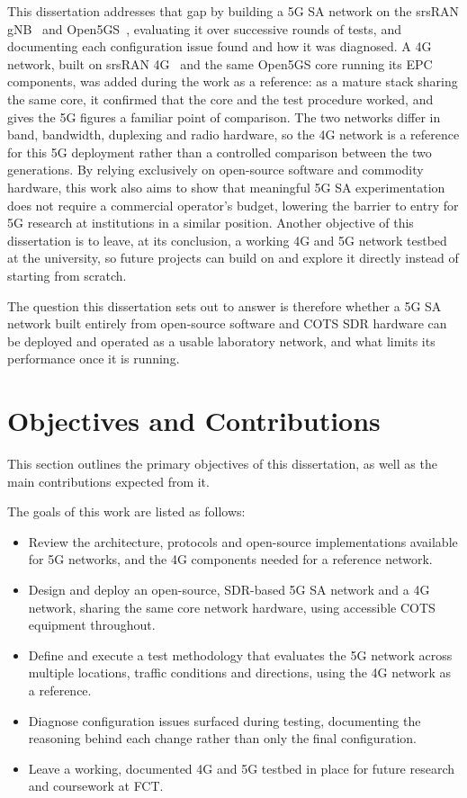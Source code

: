 This dissertation addresses that gap by building a 5G \gls{SA} network on the srsRAN \gls{gNB}~\cite{ocudu_project} and Open5GS~\cite{open5gs_repo}, evaluating it over successive rounds of tests, and documenting each configuration issue found and how it was diagnosed. A 4G network, built on srsRAN 4G~\cite{srsran_4g_repo} and the same Open5GS core running its \gls{EPC} components, was added during the work as a reference: as a mature stack sharing the same core, it confirmed that the core and the test procedure worked, and gives the 5G figures a familiar point of comparison. The two networks differ in band, bandwidth, duplexing and radio hardware, so the 4G network is a reference for this 5G deployment rather than a controlled comparison between the two generations. By relying exclusively on open-source software and commodity hardware, this work also aims to show that meaningful 5G \gls{SA} experimentation does not require a commercial operator's budget, lowering the barrier to entry for 5G research at institutions in a similar position. Another objective of this dissertation is to leave, at its conclusion, a working 4G and 5G network testbed at the university, so future projects can build on and explore it directly instead of starting from scratch. 

The question this dissertation sets out to answer is therefore whether a 5G \gls{SA} network built entirely from open-source software and \gls{COTS} \gls{SDR} hardware can be deployed and operated as a usable laboratory network, and what limits its performance once it is running.

\section{Objectives and Contributions}
\label{sec:objectives-contributions}

This section outlines the primary objectives of this dissertation, as well as the main contributions expected from it.

The goals of this work are listed as follows:
\begin{itemize}
    \item Review the architecture, protocols and open-source implementations available for 5G networks, and the 4G components needed for a reference network.
    \item Design and deploy an open-source, \gls{SDR}-based 5G \gls{SA} network and a 4G network, sharing the same core network hardware, using accessible \gls{COTS} equipment throughout.
    \item Define and execute a test methodology that evaluates the 5G network across multiple locations, traffic conditions and directions, using the 4G network as a reference.
    \item Diagnose configuration issues surfaced during testing, documenting the reasoning behind each change rather than only the final configuration.
    \item Leave a working, documented 4G and 5G testbed in place for future research and coursework at \gls{FCT}.
\end{itemize}

